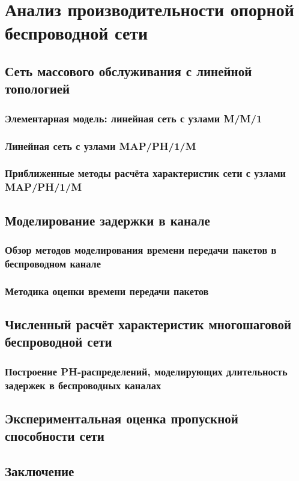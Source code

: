 \chapter{Анализ производительности опорной беспроводной сети}\label{ch:ch4}


\section{Сеть массового обслуживания с линейной топологией}\label{sec:ch4_queueing_network}

\subsection{Элементарная модель: линейная сеть с узлами M/M/1}\label{sec:ch4_mm1_network}

\subsection{Линейная сеть с узлами MAP/PH/1/M}

\subsection{Приближенные методы расчёта характеристик сети с узлами MAP/PH/1/M}



\section{Моделирование задержки в канале}\label{sec:ch4_service_time}

\subsection{Обзор методов моделирования времени передачи пакетов в беспроводном канале}

\subsection{Методика оценки времени передачи пакетов}



\section{Численный расчёт характеристик многошаговой беспроводной сети}\label{sec:ch4_numeric_results}

\subsection{Построение PH-распределений, моделирующих длительность задержек в беспроводных каналах}



\section{Экспериментальная оценка пропускной способности сети}\label{sec:ch4_stand_results}



\section{Заключение}\label{sec:ch3_conclusion}



\clearpage
